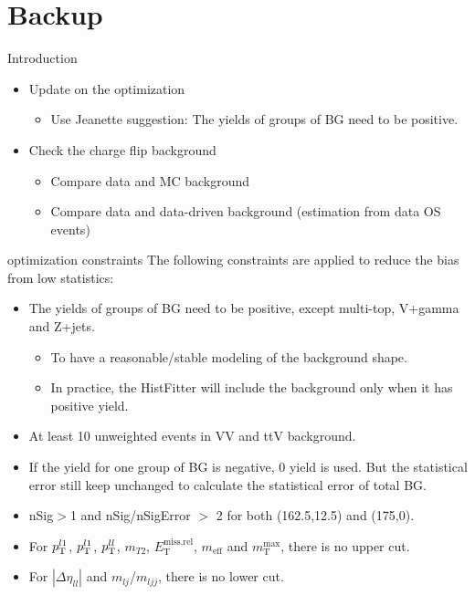 \documentclass[mathserif,serif]{beamer}
\begin{document}



\section*{Backup}
\begin{frame}{Introduction}
\begin{itemize}
\item Update on the optimization
\begin{itemize}
\item Use Jeanette suggestion: The yields of groups of BG need to be positive.
\end{itemize}
\item Check the charge flip background
\begin{itemize}
\item Compare data and MC background
\item Compare data and data-driven background (estimation from data OS events)
\end{itemize}
\end{itemize}
\end{frame}

\begin{frame}{optimization constraints}
\small
The following constraints are applied to reduce the bias from low statistics:
\begin{itemize}
\small
\item The yields of groups of BG need to be positive, except multi-top, V+gamma and Z+jets.
\begin{itemize}
\item To have a reasonable/stable modeling of the background shape.
\item In practice, the HistFitter will include the background only when it has positive yield.
\end{itemize}
\item At least 10 unweighted events in VV and ttV background.
\item If the yield for one group of BG is negative, 0 yield is used. But the statistical error still keep unchanged to calculate the statistical error of total BG.
\item nSig$>$1 and nSig/nSigError $>$ 2 for both (162.5,12.5) and (175,0).
\item For $p_{\text{T}}^{l1}$, $p_{\text{T}}^{l1}$, $p_{\text{T}}^{ll}$, $m_{T2}$, $E_{\text{T}}^{\text{miss,rel}}$, $m_{\text{eff}}$ and $m_{\text{T}}^{\text{max}}$, there is no upper cut.
\item For $|\Delta\eta_{ll}|$ and $m_{lj}$/$m_{ljj}$, there is no lower cut.
\end{itemize}
\end{frame}
\end{document}
